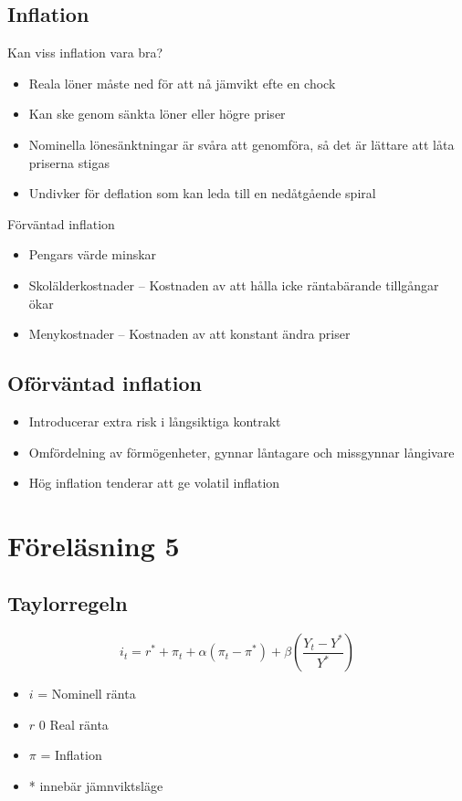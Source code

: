 \documentclass[12pt,a4paper]{article}
\begin{document}
\subsection{Inflation}
Kan viss inflation vara bra? 
\begin{itemize}
    \item Reala löner måste ned för att nå jämvikt efte en chock
    \item Kan ske genom sänkta löner eller högre priser
    \item Nominella lönesänktningar är svåra att genomföra, så det är lättare att låta priserna stigas
    \item Undivker för deflation som kan leda till en nedåtgående spiral
\end{itemize}

\noindent Förväntad inflation
\begin{itemize}
    \item Pengars värde minskar
    \item Skolälderkostnader -- Kostnaden av att hålla icke räntabärande tillgångar ökar
    \item Menykostnader -- Kostnaden av att konstant ändra priser 
\end{itemize}

\subsection{Oförväntad inflation}
\begin{itemize}
    \item Introducerar extra risk i långsiktiga kontrakt
    \item Omfördelning av förmögenheter, gynnar låntagare och missgynnar långivare
    \item Hög inflation tenderar att ge volatil inflation
\end{itemize}
\newpage
\section{Föreläsning 5}
\subsection{Taylorregeln}
$$i_t = r^* + \pi_t + \alpha(\pi_t - \pi^*) + \beta (\frac{Y_t - Y^*}{Y^*})$$
\begin{itemize}
    \item $i$ = Nominell ränta
    \item $r$ 0 Real ränta 
    \item $\pi$ = Inflation
    \item * innebär jämnviktsläge
\end{itemize}
\end{document}
